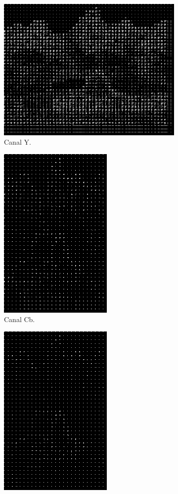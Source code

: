 \documentclass[a4paper, 12pt]{article}
\begin{document}
        \begin{figure}[H]
            \begin{subfigure}{0.3\textwidth}
                \centering
                \includegraphics[scale=0.5]{resources/Quantization/YQuantization25.png}
                \caption{ Canal Y.}
            \end{subfigure}
            \hfill
            \begin{subfigure}{0.3\textwidth}
                \centering 
                \includegraphics[scale=0.5]{resources/Quantization/CBQuantization25.png}
                \caption{ Canal Cb.}
            \end{subfigure}
            \hfill
            \begin{subfigure}{0.3\textwidth}
                \centering
                \includegraphics[scale=0.5]{resources/Quantization/CRQuantization25.png} 

\end{subfigure}
\end{figure}
\end{document}
